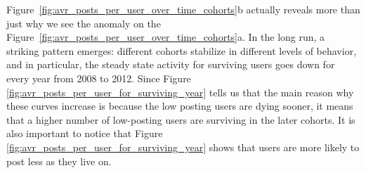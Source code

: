 Figure~\ref{fig:avr_posts_per_user_over_time_cohorts}b actually reveals more than just why we see the anomaly on the Figure~\ref{fig:avr_posts_per_user_over_time_cohorts}a. In the long run, a striking pattern emerges: different cohorts stabilize in different levels of behavior, and in particular, the steady state activity for surviving users goes down for every year from 2008 to 2012.
Since Figure \ref{fig:avr_posts_per_user_for_surviving_year} tells us that the main reason why these curves increase is because the low posting users are dying sooner, it means that a higher number of low-posting users are surviving in the later cohorts. It is also important to notice that Figure \ref{fig:avr_posts_per_user_for_surviving_year} shows that users are more likely to post less as they live on.




